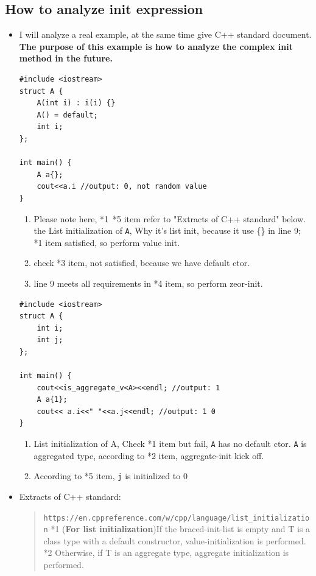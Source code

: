 \documentclass[a4paper,11pt,twoside]{book}
\begin{document}
\subsection{How to analyze init expression}
\begin{itemize}
	\item I will analyze a real example, at the same time give C++ standard document. \textbf{The purpose of this example is how to analyze the complex init method in the future.}
\begin{lstlisting}
#include <iostream>
struct A {
	A(int i) : i(i) {}
	A() = default;
	int i;
};
		
int main() {
	A a{};
	cout<<a.i //output: 0, not random value
}
\end{lstlisting}
	
	\begin{enumerate}
		\item Please note here, *1~*5 item refer to "Extracts of C++ standard" below. the List initialization of \texttt{A}, Why it's list init, because it use \{\} in line 9; *1 item satisfied, so perform value init. 
		
		\item check *3 item, not satisfied, because we have default ctor. 
		
		\item line 9 meets all requirements in *4 item, so perform zeor-init.

	\end{enumerate}
	
	
\begin{lstlisting}
#include <iostream>
struct A {
	int i;
	int j;
};
	
int main() {
	cout<<is_aggregate_v<A><<endl; //output: 1
    A a{1};
	cout<< a.i<<" "<<a.j<<endl; //output: 1 0
}
\end{lstlisting}
	
	\begin{enumerate}
		\item List initialization of A, Check *1 item but fail, \texttt{A} has no default ctor. \texttt{A} is aggregated type, according to *2 item, aggregate-init kick off.
		
		\item According to *5 item, \texttt{j} is initialized to 0		
	\end{enumerate}
	
	
	\item  Extracts of C++ standard: 
	
	\begin{quote}
		\verb|https://en.cppreference.com/w/cpp/language/list_initialization| \newline
		*1 (\textbf{For list initialization})If the braced-init-list is empty and T is a class type with a default constructor, value-initialization is performed. 
		\newline
		*2 Otherwise, if T is an aggregate type, aggregate initialization is performed.
		\newline
		 \newline
		

\end{quote}
\end{itemize}
\end{document}
